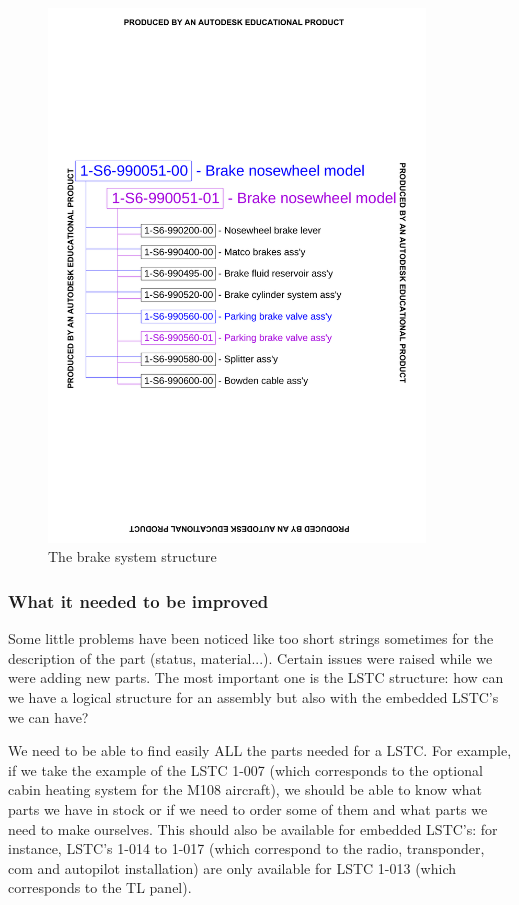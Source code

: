 \documentclass[11pt,a4paper]{article}
\begin{document}
\begin{figure}[ht!]
	\begin{center}
		\includegraphics[width=10cm,trim = 1.5cm 8.5cm 1.5cm 8.5cm, clip]{pics/PIC025.pdf}
		\caption{The brake system structure}
		\label{fig:PIC025}
	\end{center}
\end{figure}

\newpage

\subsubsection{What it needed to be improved}
Some little problems have been noticed like too short strings sometimes for the description of the part (status, material...).
Certain issues were raised while we were adding new parts. The most important one is the LSTC structure: how can we have a logical structure for an assembly but also with the embedded LSTC's we can have? %

\bigskip

We need to be able to find easily ALL the parts needed for a LSTC. For example, if we take the example of the LSTC 1-007 (which corresponds to the optional cabin heating system for the M108 aircraft), we should be able to know what parts we have in stock or if we need to order some of them and what parts we need to make ourselves.
This should also be available for embedded LSTC's: for instance, LSTC's 1-014 to 1-017 (which correspond to the radio, transponder, com and autopilot installation) are only available for LSTC 1-013 (which corresponds to the TL panel).
\end{document}
